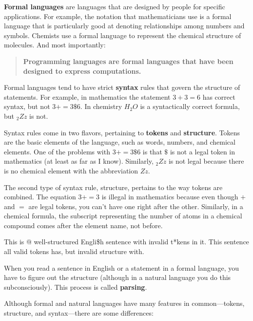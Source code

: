 {\bf Formal languages} are languages that are designed by people for
specific applications.  For example, the notation that mathematicians
use is a formal language that is particularly good at denoting
relationships among numbers and symbols.  Chemists use a formal
language to represent the chemical structure of molecules.  And
most importantly:

\begin{quote}
{\bf Programming languages are formal languages that have been
designed to express computations.}
\end{quote}

Formal languages tend to have strict {\bf syntax} rules that
govern the structure of statements.
For example, in mathematics the statement
$3 + 3 = 6$ has correct syntax, but
not $3 + = 3 \$ 6$.  In chemistry
$H_2O$ is a syntactically correct formula, but $_2Zz$ is not.

Syntax rules come in two flavors, pertaining to {\bf tokens} and
{\bf structure}.  Tokens are the basic elements of the language, such as
words, numbers, and chemical elements.  One of the problems with
$3 += 3 \$ 6$ is that \( \$ \) is not a legal token in mathematics
(at least as far as I know).  Similarly, $_2Zz$ is not legal because
there is no chemical element with the abbreviation $Zz$.

The second type of syntax rule, structure, pertains to the way tokens are
combined.  The equation $3 += 3$ is illegal in mathematics 
because even though $+$ and $=$ are legal tokens, you can't 
have one right after the other. Similarly, in a chemical formula, 
the subscript representing the number of atoms in a 
chemical compound comes after the element name, not before.

This is @ well-structured Engli\$h
sentence with invalid t*kens in it.  This sentence all valid 
tokens has, but invalid structure with.

When you read a sentence in English or a statement in a formal
language, you have to figure out the structure
(although in a natural language you do this subconsciously).  This
process is called {\bf parsing}.

Although formal and natural languages have many features in
common---tokens, structure, and syntax---there are some
differences:

